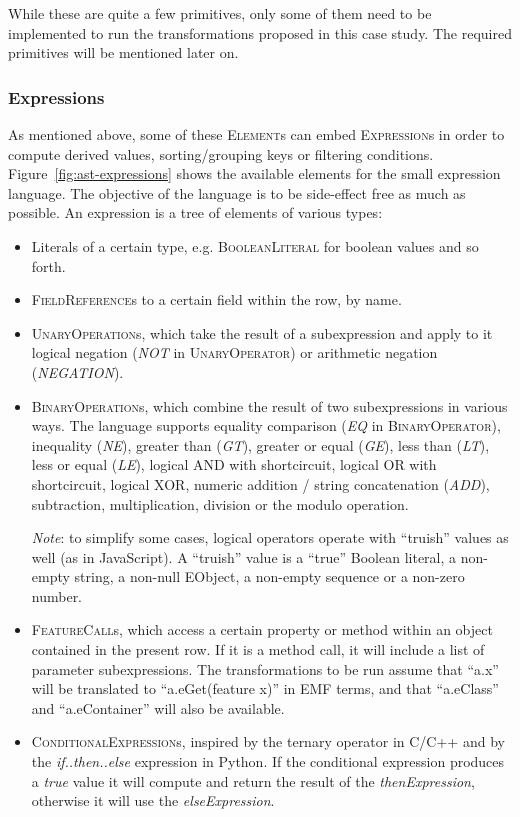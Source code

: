 \documentclass[a4paper]{scrartcl}
\newcommand*{\class}[1]{\textsc{#1}}
\begin{document}
While these are quite a few primitives, only some of them need to be
implemented to run the transformations proposed in this case
study. The required primitives will be mentioned later on.

\subsubsection{Expressions}

As mentioned above, some of these \class{Element}s can embed
\class{Expression}s in order to compute derived values,
sorting/grouping keys or filtering
conditions. Figure~\ref{fig:ast-expressions} shows the available
elements for the small expression language. The objective of the
language is to be side-effect free as much as possible. An expression
is a tree of elements of various types:

\begin{itemize}
\item Literals of a certain type, e.g. \class{BooleanLiteral} for
  boolean values and so forth.

\item \class{FieldReference}s to a certain field within the row, by
  name.

\item \class{UnaryOperation}s, which take the result of a
  subexpression and apply to it logical negation (\emph{NOT} in
  \class{UnaryOperator}) or arithmetic negation (\emph{NEGATION}).

\item \class{BinaryOperation}s, which combine the result of two
  subexpressions in various ways. The language supports equality
  comparison (\emph{EQ} in \class{BinaryOperator}), inequality
  (\emph{NE}), greater than (\emph{GT}), greater or equal (\emph{GE}),
  less than (\emph{LT}), less or equal (\emph{LE}), logical AND with
  shortcircuit, logical OR with shortcircuit, logical XOR, numeric
  addition / string concatenation (\emph{ADD}), subtraction,
  multiplication, division or the modulo operation.

  \emph{Note}: to simplify some cases, logical operators operate with
  ``truish'' values as well (as in JavaScript). A ``truish'' value is
  a ``true'' Boolean literal, a non-empty string, a non-null EObject,
  a non-empty sequence or a non-zero number.

\item \class{FeatureCall}s, which access a certain property or method
  within an object contained in the present row. If it is a method
  call, it will include a list of parameter subexpressions. The
  transformations to be run assume that ``a.x'' will be translated to
  ``a.eGet(feature x)'' in EMF terms, and that ``a.eClass'' and
  ``a.eContainer'' will also be available.

\item \class{ConditionalExpression}s, inspired by the ternary operator
  in C/C++ and by the \emph{if..then..else} expression in Python. If
  the conditional expression produces a \emph{true} value it will
  compute and return the result of the \emph{thenExpression},
  otherwise it will use the \emph{elseExpression}.
\end{itemize}
\end{document}
